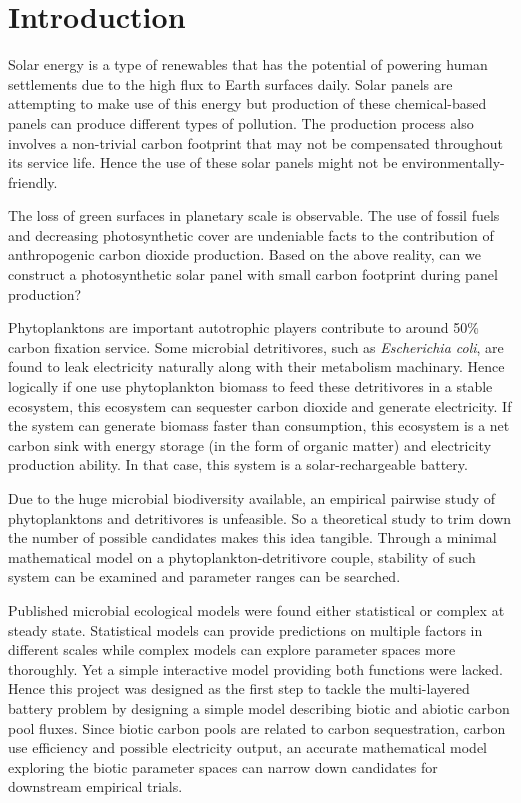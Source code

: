 \documentclass[../thesis.tex]{subfiles} %
\begin{document}
\section{Introduction}

Solar energy is a type of renewables that has the potential of powering human settlements due to the high flux to Earth surfaces daily.  Solar panels are attempting to make use of this energy but production of these chemical-based panels can produce different types of pollution.  The production process also involves a non-trivial carbon footprint that may not be compensated throughout its service life.  Hence the use of these solar panels might not be environmentally-friendly.

The loss of green surfaces in planetary scale is observable.  The use of fossil fuels and decreasing photosynthetic cover are undeniable facts to the contribution of anthropogenic carbon dioxide production.  Based on the above reality, can we construct a photosynthetic solar panel with small carbon footprint during panel production?

Phytoplanktons are important autotrophic players contribute to around 50\% carbon fixation service.  Some microbial detritivores, such as \textit{Escherichia coli}, are found to leak electricity naturally along with their metabolism machinary.  Hence logically if one use phytoplankton biomass to feed these detritivores in a stable ecosystem, this ecosystem can sequester carbon dioxide and generate electricity.  If the system can generate biomass faster than consumption, this ecosystem is a net carbon sink with energy storage (in the form of organic matter) and electricity production ability.  In that case, this system is a solar-rechargeable battery.

Due to the huge microbial biodiversity available, an empirical pairwise study of phytoplanktons and detritivores is unfeasible.  So a theoretical study to trim down the number of possible candidates makes this idea tangible.  Through a minimal mathematical model on a phytoplankton-detritivore couple, stability of such system can be examined and parameter ranges can be searched.

Published microbial ecological models were found either statistical or complex at steady state.  Statistical models can provide predictions on multiple factors in different scales while complex models can explore parameter spaces more thoroughly.  Yet a simple interactive model providing both functions were lacked.  Hence this project was designed as the first step to tackle the multi-layered battery problem by designing a simple model describing biotic and abiotic carbon pool fluxes.  Since biotic carbon pools are related to carbon sequestration, carbon use efficiency and possible electricity output, an accurate mathematical model exploring the biotic parameter spaces can narrow down candidates for downstream empirical trials.
\end{document}
